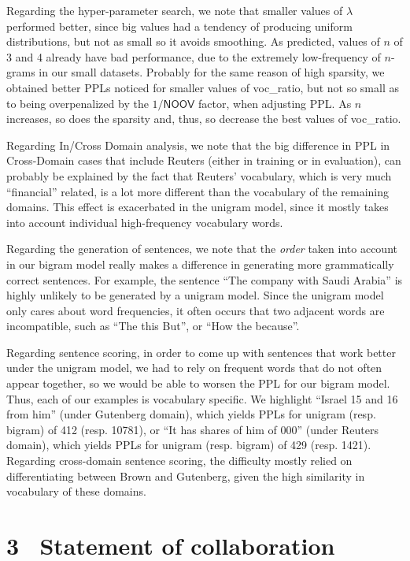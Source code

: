 \documentclass[11pt]{article}
\begin{document}
Regarding the hyper-parameter search, we note that smaller values of $\lambda$ performed better, since big values had a tendency of producing uniform distributions, but not as small so it avoids smoothing. As predicted, values of $n$ of 3 and 4 already have bad performance, due to the extremely low-frequency of $n$-grams in our small datasets. Probably for the same reason of high sparsity, we obtained better PPLs noticed for smaller values of \textsf{voc\_ratio}, but not so small as to being overpenalized by the $1/\textsf{NOOV}$ factor, when adjusting PPL. As $n$ increases, so does the sparsity and, thus, so decrease the best values of \textsf{voc\_ratio}.

Regarding In/Cross Domain analysis, we note that the big difference in PPL in Cross-Domain cases that include Reuters (either in training or in evaluation), can probably be explained by the fact that Reuters' vocabulary, which is very much ``financial'' related, is a lot more different than the vocabulary of the remaining domains. This effect is exacerbated in the unigram model, since it mostly takes into account individual high-frequency vocabulary words.

Regarding the generation of sentences, we note that the \textit{order} taken into account in our bigram model really makes a difference in generating more grammatically correct sentences. For example, the sentence ``The company with Saudi Arabia'' is highly unlikely to be generated by a unigram model. Since the unigram model only cares about word frequencies, it often occurs that two adjacent words are incompatible, such as ``The this But'', or ``How the because''.

Regarding sentence scoring, in order to come up with sentences that work better under the unigram model, we had to rely on frequent words that do not often appear together, so we would be able to worsen the PPL for our bigram model. Thus, each of our examples is vocabulary specific. We highlight ``Israel 15 and 16 from him'' (under Gutenberg domain), which yields PPLs for unigram (resp. bigram) of 412 (resp. 10781), or ``It has shares of him of 000'' (under Reuters domain), which yields PPLs for unigram (resp. bigram) of 429 (resp. 1421). Regarding cross-domain sentence scoring, the difficulty mostly relied on differentiating between Brown and Gutenberg, given the high similarity in vocabulary of these domains.

\section*{3$\;\;$ Statement of collaboration}
\end{document}
